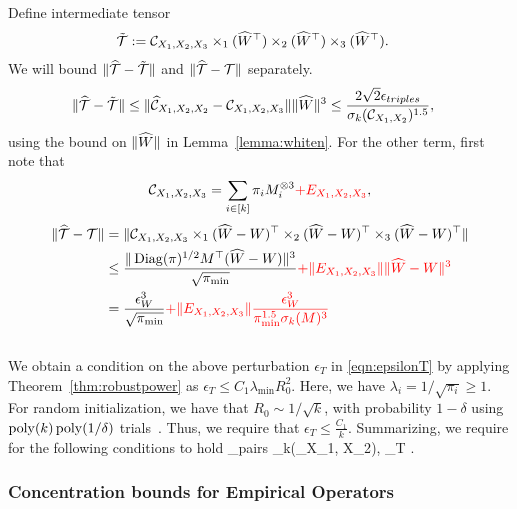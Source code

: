\bprf  Define
  intermediate tensor
\begin{align*} \tilde{{\mathcal{T}}}&:= \mathcal{C}_{X_1,X_2,X_3} \times_1 (\widehat{W}^\top) \times_2 (\widehat{W}^\top) \times_3 (\widehat{W}^\top).\end{align*}
We will bound $\|\widehat{{\mathcal{T}}}-\tilde{{\mathcal{T}}}\|$  and $\| \widehat{{\mathcal{T}}}-{\mathcal{T}}\|$  separately. 
\begin{align*}
\|\widehat{{\mathcal{T}}}-\tilde{{\mathcal{T}}}\| &\leq \|\widehat{\mathcal{C}}_{X_1, X_2, X_2} - \mathcal{C}_{X_1, X_2, X_3}\| \|\widehat{W}\|^3\leq \frac{2\sqrt{2}\epsilon_{triples}}{\sigma_k(\mathcal{C}_{X_1, X_2})^{1.5} },
\end{align*}using the bound on $\|\widehat{W}\|$ in Lemma~\ref{lemma:whiten}. For the other term,
first note that
\[ \mathcal{C}_{X_1, X_2, X_3} = \sum_{i\in [k]} \pi_i M_i^{\otimes 3}\textcolor{red}{+ E_{X_1, X_2, X_3}}, \]
\begin{align*} \|\widehat{{\mathcal{T}}}-{\mathcal{T}}\|&= \| \mathcal{C}_{X_1, X_2, X_3}\times_1 (\widehat{W} -W)^\top \times_2 (\widehat{W} -W)^\top \times_3 (\widehat{W}-W)^\top\| \\
&\leq \frac{ \| \operatorname{Diag}(\pi)^{1/2}M^\top(\widehat{W}-W)\|^3}{\sqrt{\pi_{\min}}}
\textcolor{red}{+ \|E_{X_1,X_2,X_3}\| \|\widehat{W}-W\|^3}\\
&= \frac{\epsilon_W^3}{\sqrt{\pi_{\min}}}
\textcolor{red}{+ \|E_{X_1,X_2,X_3}\| \frac{\epsilon_W^3}{\pi_{\min}^{1.5} \sigma_k(M)^3} }
\end{align*}
\eprf\\


We obtain a condition on the above perturbation $\epsilon_T$ in \eqref{eqn:epsilonT} by applying Theorem~\ref{thm:robustpower} as
$ \epsilon_T\leq C_1\lambda_{\min} R_0^2$. Here, we have $\lambda_{i} = 1/\sqrt{\pi_{i}}\geq 1$. For random initialization, we have that $R_0 \sim 1/\sqrt{k}$, with probability $1-\delta$ using $\operatorname{poly}(k) \operatorname{poly}(1/\delta)$ trials~\cite[Thm. 5.1]{AnandkumarEtal:tensor12}. Thus, we require that $ \epsilon_T  \leq \frac{C_1}{k}$. Summarizing, we require for the following conditions to hold 
\beq\epsilon_{pairs} \sigma_k(\Ccal_{X_1, X_2}), \quad \epsilon_T  \leq {}.\eeq


\subsubsection{Concentration bounds for Empirical Operators}

